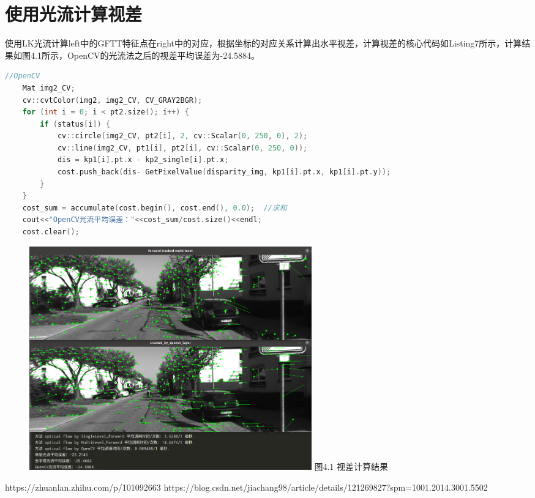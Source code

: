 \documentclass[40pt,a4paper，UTF8]{ctexart}
\numberwithin{equation}{section}
\begin{document}
\section{使用光流计算视差} 
使用LK光流计算left中的GFTT特征点在right中的对应，根据坐标的对应关系计算出水平视差，计算视差的核心代码如Listing7所示，计算结果如图4.1所示，OpenCV的光流法之后的视差平均误差为-24.5884。
\begin{lstlisting}[language=C++, caption=计算视差的核心代码]
    //OpenCV
    Mat img2_CV;
    cv::cvtColor(img2, img2_CV, CV_GRAY2BGR);
    for (int i = 0; i < pt2.size(); i++) {
        if (status[i]) {
            cv::circle(img2_CV, pt2[i], 2, cv::Scalar(0, 250, 0), 2);
            cv::line(img2_CV, pt1[i], pt2[i], cv::Scalar(0, 250, 0));
            dis = kp1[i].pt.x - kp2_single[i].pt.x;
            cost.push_back(dis- GetPixelValue(disparity_img, kp1[i].pt.x, kp1[i].pt.y));
        }
    }
    cost_sum = accumulate(cost.begin(), cost.end(), 0.0);  //求和
    cout<<"OpenCV光流平均误差："<<cost_sum/cost.size()<<endl;
    cost.clear();
\end{lstlisting}

\begin{figure}[H]
\centering
\includegraphics[width=4.8in]{ch6_4_1.png} {图4.1 视差计算结果}
\end{figure}



\begin{thebibliography}{99}  
https://zhuanlan.zhihu.com/p/101092663
https://blog.csdn.net/jiachang98/article/details/121269827?spm=1001.2014.3001.5502
\end{thebibliography}
\end{document}
